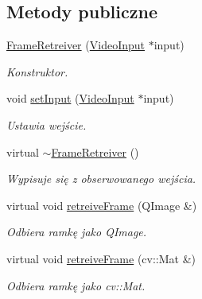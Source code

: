 \subsection*{Metody publiczne}
\begin{DoxyCompactItemize}
\item 
\hyperlink{class_frame_retreiver_aec5e4a7cd0af2badc9b47fd3c936ac60}{FrameRetreiver} (\hyperlink{class_video_input}{VideoInput} $\ast$input)
\begin{DoxyCompactList}\small\item\em Konstruktor. \item\end{DoxyCompactList}\item 
void \hyperlink{class_frame_retreiver_a8d7772f0a3d6373f5a54bf4fcc042ccc}{setInput} (\hyperlink{class_video_input}{VideoInput} $\ast$input)
\begin{DoxyCompactList}\small\item\em Ustawia wejście. \item\end{DoxyCompactList}\item 
\hypertarget{class_frame_retreiver_a2345c5f4273008325ecfaf84f63d001c}{
virtual \hyperlink{class_frame_retreiver_a2345c5f4273008325ecfaf84f63d001c}{$\sim$FrameRetreiver} ()}
\label{class_frame_retreiver_a2345c5f4273008325ecfaf84f63d001c}

\begin{DoxyCompactList}\small\item\em Wypisuje się z obserwowanego wejścia. \item\end{DoxyCompactList}\item 
virtual void \hyperlink{class_frame_retreiver_a061c97e43f3b73705903e49afad3e5bf}{retreiveFrame} (QImage \&)
\begin{DoxyCompactList}\small\item\em Odbiera ramkę jako QImage. \item\end{DoxyCompactList}\item 
virtual void \hyperlink{class_frame_retreiver_a72912583af45c00d267f215a0d0b9bb1}{retreiveFrame} (cv::Mat \&)
\begin{DoxyCompactList}\small\item\em Odbiera ramkę jako cv::Mat. \item\end{DoxyCompactList}\end{DoxyCompactItemize}


